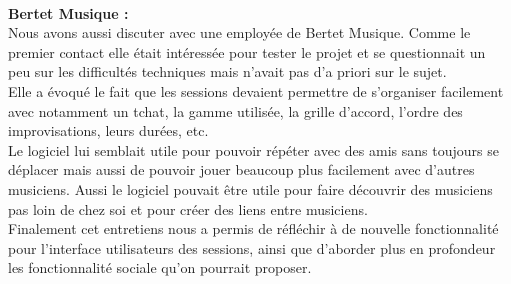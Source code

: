 \documentclass[a4,12pt]{article}
\begin{document}
\\

\textbf{Bertet Musique :}\\
Nous avons aussi discuter avec une employée de Bertet Musique. Comme le premier contact elle était intéressée pour tester le projet et se questionnait un peu sur les difficultés techniques mais n’avait pas d’a priori sur le sujet.\\
Elle a évoqué le fait que les sessions devaient permettre de s’organiser facilement avec notamment un tchat, la gamme utilisée, la grille d’accord, l’ordre des improvisations, leurs durées, etc.\\
Le logiciel lui semblait utile pour pouvoir répéter avec des amis sans toujours se déplacer mais aussi de pouvoir jouer beaucoup plus facilement avec d'autres musiciens.
Aussi le logiciel pouvait être utile pour faire découvrir des musiciens pas loin de chez soi et pour créer des liens entre musiciens.\\

Finalement cet entretiens nous a permis de réfléchir à de nouvelle fonctionnalité pour l’interface utilisateurs des sessions, ainsi que d’aborder plus en profondeur les fonctionnalité sociale qu’on pourrait proposer.
\end{document}
